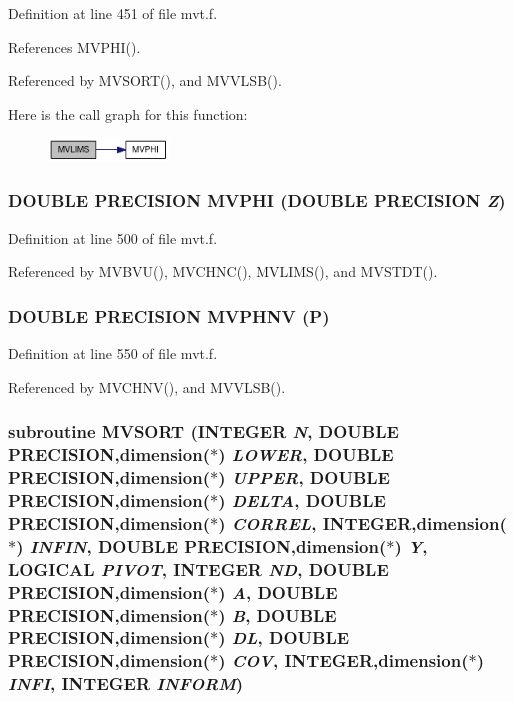 Definition at line 451 of file mvt.f.

References MVPHI().

Referenced by MVSORT(), and MVVLSB().

Here is the call graph for this function:\nopagebreak
\begin{figure}[H]
\begin{center}
\leavevmode
\includegraphics[width=91pt]{mvt_8f_ae28c99f4b4ff2300cfa96ffa62bf799_cgraph}
\end{center}
\end{figure}
\hypertarget{mvt_8f_a0072dd6ba4c47d28d78d231b5af9571}{
\subsubsection[{MVPHI}]{\setlength{\rightskip}{0pt plus 5cm}DOUBLE PRECISION MVPHI (DOUBLE PRECISION {\em Z})}}
\label{mvt_8f_a0072dd6ba4c47d28d78d231b5af9571}




Definition at line 500 of file mvt.f.

Referenced by MVBVU(), MVCHNC(), MVLIMS(), and MVSTDT().\hypertarget{mvt_8f_9ce2ff2aa4833561178c981ac2469470}{
\subsubsection[{MVPHNV}]{\setlength{\rightskip}{0pt plus 5cm}DOUBLE PRECISION MVPHNV (P)}}
\label{mvt_8f_9ce2ff2aa4833561178c981ac2469470}




Definition at line 550 of file mvt.f.

Referenced by MVCHNV(), and MVVLSB().\hypertarget{mvt_8f_e6a30b16d74f1c585c70de45080c0805}{
\subsubsection[{MVSORT}]{\setlength{\rightskip}{0pt plus 5cm}subroutine MVSORT (INTEGER {\em N}, \/  DOUBLE PRECISION,dimension($\ast$) {\em LOWER}, \/  DOUBLE PRECISION,dimension($\ast$) {\em UPPER}, \/  DOUBLE PRECISION,dimension($\ast$) {\em DELTA}, \/  DOUBLE PRECISION,dimension($\ast$) {\em CORREL}, \/  INTEGER,dimension($\ast$) {\em INFIN}, \/  DOUBLE PRECISION,dimension($\ast$) {\em Y}, \/  LOGICAL {\em PIVOT}, \/  INTEGER {\em ND}, \/  DOUBLE PRECISION,dimension($\ast$) {\em A}, \/  DOUBLE PRECISION,dimension($\ast$) {\em B}, \/  DOUBLE PRECISION,dimension($\ast$) {\em DL}, \/  DOUBLE PRECISION,dimension($\ast$) {\em COV}, \/  INTEGER,dimension($\ast$) {\em INFI}, \/  INTEGER {\em INFORM})}}
\label{mvt_8f_e6a30b16d74f1c585c70de45080c0805}




